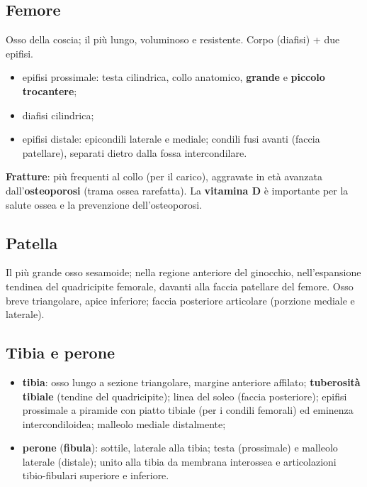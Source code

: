 \subsection{Femore}
Osso della coscia; il più lungo, voluminoso e resistente. Corpo (diafisi) + due epifisi.
\begin{itemize}
  \item epifisi prossimale: testa cilindrica, collo anatomico, \textbf{grande} e \textbf{piccolo
    trocantere};
  \item diafisi cilindrica;
  \item epifisi distale: epicondili laterale e mediale; condili fusi avanti (faccia patellare),
    separati dietro dalla fossa intercondilare.
\end{itemize}
\textbf{Fratture}: più frequenti al collo (per il carico), aggravate in età avanzata
dall'\textbf{osteoporosi} (trama ossea rarefatta). La \textbf{vitamina D} è importante per la salute
ossea e la prevenzione dell'osteoporosi.

\subsection{Patella}
Il più grande osso sesamoide; nella regione anteriore del ginocchio, nell'espansione tendinea del
quadricipite femorale, davanti alla faccia patellare del femore. Osso breve triangolare, apice
inferiore; faccia posteriore articolare (porzione mediale e laterale).

\subsection{Tibia e perone}
\begin{itemize}
  \item \textbf{tibia}: osso lungo a sezione triangolare, margine anteriore affilato; \textbf{tuberosità
    tibiale} (tendine del quadricipite); linea del soleo (faccia posteriore); epifisi prossimale a
    piramide con piatto tibiale (per i condili femorali) ed eminenza intercondiloidea; malleolo
    mediale distalmente;
  \item \textbf{perone} (\textbf{fibula}): sottile, laterale alla tibia; testa (prossimale) e
    malleolo laterale (distale); unito alla tibia da membrana interossea e articolazioni
    tibio-fibulari superiore e inferiore.
\end{itemize}

